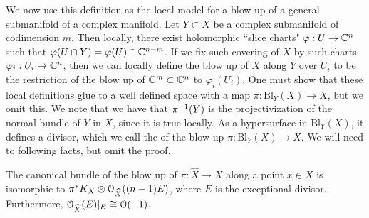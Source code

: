 We now use this definition as the local model for a blow up of a general
submanifold of a complex manifold. Let $Y \subset X$ be a complex submanifold
of codimension $m$. Then locally, there exist holomorphic ``slice charts"
$\varphi : U \to \mathbb{C}^n$ such that $\varphi(U \cap Y) = \varphi(U) \cap \mathbb{C}^{n-m}$.
If we fix such covering of $X$ by such charts $\varphi_i : U_i \to \mathbb{C}^n$, then
we can locally define the blow up of $X$ along $Y$ over $U_i$ to
be the restriction of the blow up of $\mathbb{C}^m \subset \mathbb{C}^n$ to $\varphi_i(U_i)$.
One must show that these local definitions glue to a well defined space
with a map $\pi : \mathrm{Bl}_{Y}(X) \to X$, but we omit this. We note that
we have that $\pi^{-1}(Y)$ is the projectivization of the normal bundle of $Y$ in
$X$, since it is true locally. As a hypersurface in $\mathrm{Bl}_Y(X)$, it
defines a divisor, which we call the  of the blow up
$\pi : \mathrm{Bl}_Y(X) \to X$.
%
We will need to following facts, but omit the proof.
%
\begin{prop}
The canonical bundle of the blow up of $\pi : \widehat{X} \to X$ along a point $x \in X$
is isomorphic to $\pi^*K_X \otimes \mathcal{O}_{\widehat{X}}((n-1)E)$, where $E$ is the
exceptional divisor. Furthermore, $\mathcal{O}_{\widehat{X}}(E)\vert_E \cong \mathcal{O}(-1)$.
\end{prop}
%
